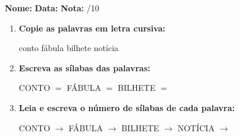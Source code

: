 \begin{exercicio}



\noindent\textbf{Nome:} \underline{\hspace{3.2cm}} \quad \textbf{Data:} \underline{\hspace{1.6cm}} \quad \textbf{Nota:} \underline{\hspace{0.9cm}}/10


\begin{enumerate}

  \item \textbf{Copie as palavras em letra cursiva:}
  \begin{center}
  conto \quad fábula \quad bilhete \quad notícia
  \end{center}
  \begin{center}
  \underline{\hspace{2.4cm}} \quad \underline{\hspace{2.4cm}} \quad \underline{\hspace{2.4cm}} \quad \underline{\hspace{2.4cm}}
  \end{center}

  \item \textbf{Escreva as sílabas das palavras:}
  \begin{center}
  CONTO $=$ \underline{\hspace{1.5cm}} \underline{\hspace{1.5cm}} \quad FÁBULA $=$ \underline{\hspace{1.5cm}} \underline{\hspace{1.5cm}} \quad BILHETE $=$ \underline{\hspace{1.5cm}} \underline{\hspace{1.5cm}}
  \end{center}

  \item \textbf{Leia e escreva o número de sílabas de cada palavra:}
  \begin{center}
  CONTO $\rightarrow$ \underline{\hspace{0.9cm}} \quad FÁBULA $\rightarrow$ \underline{\hspace{0.9cm}} \quad BILHETE $\rightarrow$ \underline{\hspace{0.9cm}} \quad NOTÍCIA $\rightarrow$ \underline{\hspace{0.9cm}}
  \end{center}


\end{enumerate}
\end{exercicio}
